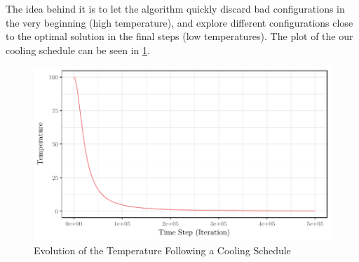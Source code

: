 The idea behind it is to let the algorithm quickly discard bad configurations in the very beginning (high temperature), and explore different configurations close to the optimal solution in the final steps (low temperatures). The plot of the our cooling schedule can be seen in \cref{fig:temp}.
\begin{figure}[H]
    \centering
    \includegraphics[width=\textwidth]{images/temp}
    \caption{Evolution of the Temperature Following a Cooling Schedule}
    \label{fig:temp}
\end{figure}










